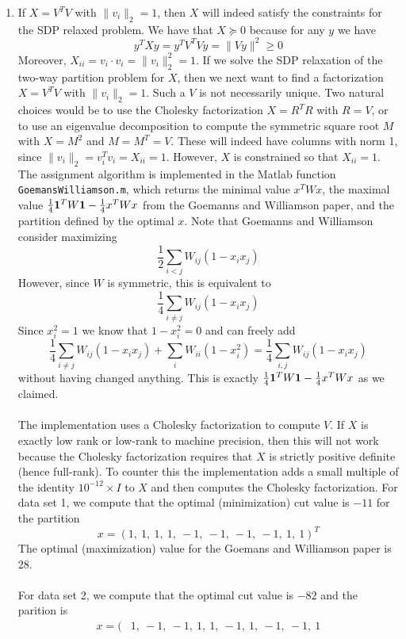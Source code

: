 \documentclass[11pt]{amsart}
\begin{document}
\begin{enumerate}
\begin{enumerate}
\item If $X = V^TV$ with $\|v_i\|_2 = 1$, then $X$ will indeed satisfy the constraints for the SDP relaxed problem.  We have that $X \succeq 0$ because for any $y$ we have
\[
y^TXy = y^TV^TVy = \|Vy\|^2 \ge 0
\]
Moreover, $X_{ii} = v_i \cdot v_i = \|v_i\|_2^2 = 1$.  If we solve the SDP relaxation of the two-way partition problem for $X$, then we next want to find a factorization $X = V^TV$ with $\|v_i\|_2 = 1$.  Such a $V$ is not necessarily unique.  Two natural choices would be to use the Cholesky factorization $X = R^TR$ with $R = V$, or to use an eigenvalue decomposition to compute the symmetric square root $M$ with $X = M^2$ and $M = M^T = V$.  These will indeed have columns with norm 1, since $\|v_i\|_2 = v_i^Tv_i = X_{ii} = 1$.  However, $X$ is constrained so that $X_{ii} = 1$.  The assignment algorithm is implemented in the Matlab function \texttt{GoemansWilliamson.m}, which returns the minimal value $x^TWx$, the maximal value $\frac{1}{4}{\bf 1}^TW{\bf 1} - \frac{1}{4}x^TWx$ from the Goemanns and Williamson paper, and the partition defined by the optimal $x$.  Note that Goemanns and Williamson consider maximizing
\[
\frac{1}{2}\sum_{i < j} W_{ij}(1 - x_ix_j)
\]
However, since $W$ is symmetric, this is equivalent to
\[
\frac{1}{4}\sum_{i \neq j} W_{ij}(1 - x_i x_j)
\]
Since $x_i^2 = 1$ we know that $1 - x_i^2 = 0$ and can freely add
\[
\frac{1}{4}\sum_{i \neq j} W_{ij}(1 - x_i x_j) + \sum_{i} W_{ii}(1 - x_i^2) = \frac{1}{4}\sum_{i,j} W_{ij}(1 - x_ix_j)
\]
without having changed anything.  This is exactly $\frac{1}{4}{\bf 1}^TW{\bf 1} - \frac{1}{4}x^TWx$ as we claimed.\\
\\
The implementation uses a Cholesky factorization to compute $V$.  If $X$ is exactly low rank or low-rank to machine precision, then this will not work because the Cholesky factorization requires that $X$ is strictly positive definite (hence full-rank).  To counter this the implementation adds a small multiple of the identity $10^{-12} \times I$ to $X$ and then computes the Cholesky factorization.  For data set 1, we compute that the optimal (minimization) cut value is $-11$ for the partition
\[
x = (1,\ 1,\ 1,\ 1,\ -1,\ -1,\ -1,\ -1,\ 1,\ 1)^T
\]
The optimal (maximization) value for the Goemans and Williamson paper is 28.\\
\\
For data set 2, we compute that the optimal cut value is $-82$ and the parition is
\begin{align*}
x = (&1,\ -1,\ -1,\ 1,\ 1,\ -1,\ 1,\ -1,\ -1,\ 1\\

\end{align*}
\end{enumerate}
\end{enumerate}
\end{document}
